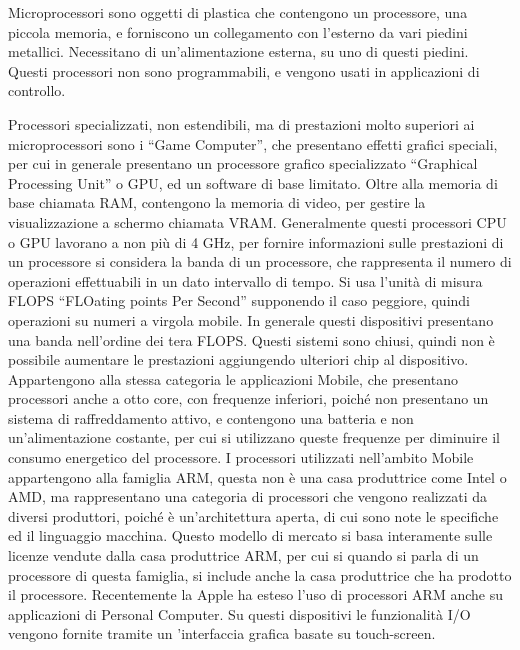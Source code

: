 \documentclass{article}
\numberwithin{equation}{subsection}
\begin{document}
Microprocessori sono oggetti di plastica che contengono un processore, una piccola memoria, e forniscono un collegamento con l'esterno da vari piedini metallici. Necessitano di 
un'alimentazione esterna, su uno di questi piedini. Questi processori non sono programmabili, e vengono usati in applicazioni di controllo. 


Processori specializzati, non estendibili, ma di prestazioni molto superiori ai microprocessori sono i ``Game Computer'', che presentano effetti grafici speciali, per cui 
in generale presentano un processore grafico specializzato ``Graphical Processing Unit'' o GPU, ed un software di base limitato. Oltre alla memoria di base chiamata RAM, contengono la memoria di video, per gestire 
la visualizzazione a schermo chiamata VRAM. Generalmente questi processori CPU o GPU lavorano a non più di 4 GHz, per fornire informazioni sulle prestazioni di un processore 
si considera la banda di un processore, che rappresenta il numero di operazioni effettuabili in un dato intervallo di tempo. Si usa l'unità di misura FLOPS ``FLOating points Per Second'' 
supponendo il caso peggiore, quindi operazioni su numeri a virgola mobile. In generale questi dispositivi presentano una banda nell'ordine dei tera FLOPS. 
Questi sistemi sono chiusi, quindi non è possibile aumentare le prestazioni aggiungendo ulteriori chip al dispositivo. 
Appartengono alla stessa categoria le applicazioni Mobile, che presentano processori anche a otto core, con frequenze inferiori, poiché non presentano un sistema di raffreddamento 
attivo, e contengono una batteria e non un'alimentazione costante, per cui si utilizzano queste frequenze per diminuire il consumo energetico del processore. I processori 
utilizzati nell'ambito Mobile appartengono alla famiglia ARM, questa non è una casa produttrice come Intel o AMD, ma rappresentano una categoria di processori che vengono 
realizzati da diversi produttori, poiché è un'architettura aperta, di cui sono note le specifiche ed il linguaggio macchina. Questo modello di mercato si basa interamente sulle 
licenze vendute dalla casa produttrice ARM, per cui si quando si parla di un processore di questa famiglia, si include anche la casa produttrice che ha prodotto il processore. 
Recentemente la Apple ha esteso l'uso di processori ARM anche su applicazioni di Personal Computer. Su questi dispositivi le funzionalità I/O vengono fornite tramite un 
'interfaccia grafica basate su touch-screen. 
\end{document}

